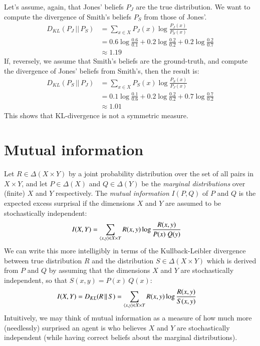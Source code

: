 \documentclass[nobib,nofonts]{tufte-handout}
\begin{document}
\begin{example}
  Let's assume, again, that Jones' beliefs $P_{J}$ are the true distribution.
  We want to compute the divergence of Smith's beliefs $P_{S}$ from those of Jones'.
  \begin{align*}
    D_{KL}(P_{J} \,||\, P_{S}) & = \sum_{x \in X} P_{J}(x) \log  \frac{P_{J}(x)}{P_{S}(x)} \\
                               & = 0.6 \log \frac{0.6}{0.1} +
                                 0.2 \log \frac{0.2}{0.2} +
                                 0.2 \log \frac{0.2}{0.7} \\
    & \approx 1.19
  \end{align*}
  If, reversely, we assume that Smith's beliefs are the ground-truth, and compute the divergence of Jones' beliefs from Smith's, then the result is:
  \begin{align*}
    D_{KL}(P_{S} \,||\, P_{J}) & = \sum_{x \in X} P_{S}(x) \log  \frac{P_{S}(x)}{P_{J}(x)} \\
                               & = 0.1 \log \frac{0.1}{0.6} +
                                   0.2 \log \frac{0.2}{0.2} +
                                   0.7 \log \frac{0.7}{0.2} \\
    & \approx 1.01
  \end{align*}
  This shows that KL-divergence is not a symmetric measure.
\end{example}


\section{Mutual information}

Let $R \in \Delta(X \times Y)$ by a joint probability distribution over the set of all pairs in $X \times Y$, and let $P \in \Delta(X)$ and $Q \in \Delta(Y)$ be the \emph{marginal distributions} over (finite) $X$ and $Y$ respectively.
The \emph{mutual information} $I(P,Q)$ of $P$ and $Q$ is the expected excess surprisal if the dimensions $X$ and $Y$ are assumed to be stochastically independent:
\begin{align*}
  I(X,Y) & = \sum_{\left \langle x,y\right\rangle \in X \times Y} R(x,y) \log \frac{R(x,y)}{P(x) \ Q(y)}
\end{align*}
We can write this more intelligibly in terms of the Kullback-Leibler divergence between true distribution $R$ and the distribution $S \in \Delta(X \times Y)$ which is derived from $P$ and $Q$ by assuming that the dimensions $X$ and $Y$ are stochastically independent, so that $S(x,y) = P(x) \ Q(x)$:
\begin{align*}
  I(X,Y) & =  D_{KL}(R \,||\, S) = \sum_{\left \langle x,y\right\rangle \in X \times Y} R(x,y) \log \frac{R(x,y)}{S(x,y)}
\end{align*}
Intuitively, we may think of mutual information as a measure of how much more (needlessly) surprised an agent is who believes $X$ and $Y$ are stochastically independent (while having correct beliefs about the marginal distributions).
\end{document}
